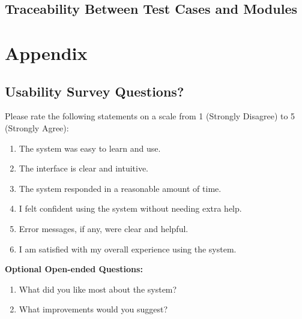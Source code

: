 \documentclass[12pt, titlepage]{article}
\begin{document}
\subsection{Traceability Between Test Cases and Modules}

				



%

\newpage

\section{Appendix}

\subsection{Usability Survey Questions?}
\label{sub:survey}
Please rate the following statements on a scale from 1 (Strongly Disagree) to 5 (Strongly Agree):

\begin{enumerate}
    \item The system was easy to learn and use.
    \item The interface is clear and intuitive.
    \item The system responded in a reasonable amount of time.
    \item I felt confident using the system without needing extra help.
    \item Error messages, if any, were clear and helpful.
    \item I am satisfied with my overall experience using the system.
\end{enumerate}

\vspace{1em}

\noindent \textbf{Optional Open-ended Questions:}
\begin{enumerate}
    \item What did you like most about the system?
    \item What improvements would you suggest?
\end{enumerate}
\end{document}
